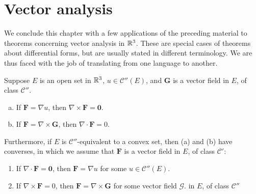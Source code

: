 
\section{Vector analysis}

We conclude this chapter with a few applications of the preceding material to theorems concerning vector analysis in ${\protect\mathbb R}^3$. 
These are special cases of theorems about differential forms, but are usually stated in different terminology. 
We are thus faced with the job of translating from one language to another.

\begin{myDef}

\end{myDef}

\begin{thm}
    \label{thm:10.43}
    Suppose $E$ is an open set in ${\protect\mathbb R}^3$, $u \in \mathscr{C}''(E)$, and $\mathbf{G}$ is a vector field in $E$, of class $\mathscr{C}''$.
    \begin{enumerate}[(a)]
        \item If $\mathbf{F} = \nabla u$, then $\nabla \times \mathbf{F} = \mathbf{0}$.
        \item If $\mathbf{F} = \nabla \times \mathbf{G}$, then $\nabla \cdot \mathbf{F} = 0$.
    \end{enumerate}

    Furthermore, if $E$ is $\mathscr{C}''$-equivalent to a convex set, 
    then (a) and (b) have converses, 
    in which we assume that $\mathbf{F}$ is a vector field in $E$, of class $\mathscr{C}'$:
    \begin{enumerate}[(a')]
        \item If $\nabla \cdot \mathbf{F} = \mathbf{0}$, then $\mathbf{F} = \nabla u$ for some $u \in \mathscr{C}''(E)$.
        \item If $\nabla \times \mathbf{F} = 0$, then $\mathbf{F} = \nabla \times \mathbf{G}$ for some vector field $\mathscr{G}$. in $E$, of class $\mathscr{C}''$
    \end{enumerate}
\end{thm}

\begin{myDef}

\end{myDef}

\begin{myDef}
    
\end{myDef}


